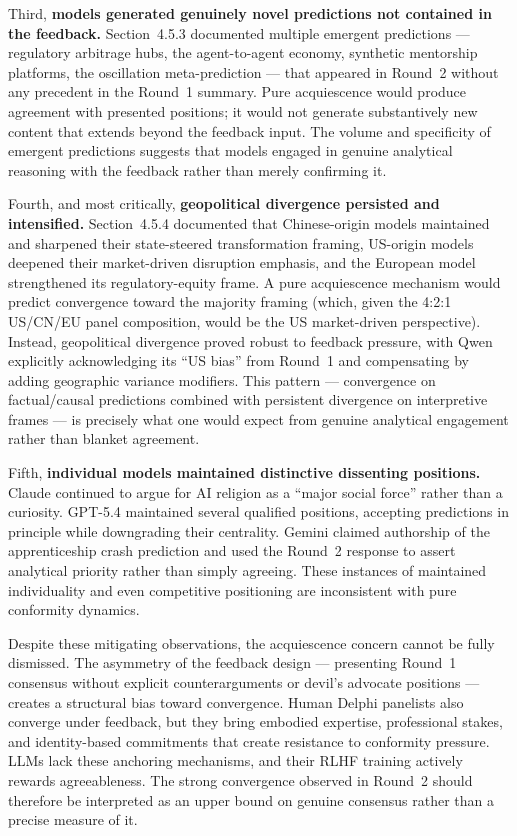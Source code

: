 \documentclass[preprint,review,12pt]{elsarticle}
\begin{document}
Third, \textbf{models generated genuinely novel predictions not contained in the feedback.} Section~4.5.3 documented multiple emergent predictions --- regulatory arbitrage hubs, the agent-to-agent economy, synthetic mentorship platforms, the oscillation meta-prediction --- that appeared in Round~2 without any precedent in the Round~1 summary. Pure acquiescence would produce agreement with presented positions; it would not generate substantively new content that extends beyond the feedback input. The volume and specificity of emergent predictions suggests that models engaged in genuine analytical reasoning with the feedback rather than merely confirming it.

Fourth, and most critically, \textbf{geopolitical divergence persisted and intensified.} Section~4.5.4 documented that Chinese-origin models maintained and sharpened their state-steered transformation framing, US-origin models deepened their market-driven disruption emphasis, and the European model strengthened its regulatory-equity frame. A pure acquiescence mechanism would predict convergence toward the majority framing (which, given the 4:2:1 US/CN/EU panel composition, would be the US market-driven perspective). Instead, geopolitical divergence proved robust to feedback pressure, with Qwen explicitly acknowledging its ``US bias'' from Round~1 and compensating by adding geographic variance modifiers. This pattern --- convergence on factual/causal predictions combined with persistent divergence on interpretive frames --- is precisely what one would expect from genuine analytical engagement rather than blanket agreement.

Fifth, \textbf{individual models maintained distinctive dissenting positions.} Claude continued to argue for AI religion as a ``major social force'' rather than a curiosity. GPT-5.4 maintained several qualified positions, accepting predictions in principle while downgrading their centrality. Gemini claimed authorship of the apprenticeship crash prediction and used the Round~2 response to assert analytical priority rather than simply agreeing. These instances of maintained individuality and even competitive positioning are inconsistent with pure conformity dynamics.

Despite these mitigating observations, the acquiescence concern cannot be fully dismissed. The asymmetry of the feedback design --- presenting Round~1 consensus without explicit counterarguments or devil's advocate positions --- creates a structural bias toward convergence. Human Delphi panelists also converge under feedback, but they bring embodied expertise, professional stakes, and identity-based commitments that create resistance to conformity pressure. LLMs lack these anchoring mechanisms, and their RLHF training actively rewards agreeableness. The strong convergence observed in Round~2 should therefore be interpreted as an upper bound on genuine consensus rather than a precise measure of it.
\end{document}
